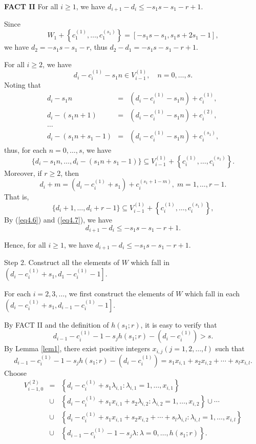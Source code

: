 \documentclass[12pt]{article}
\numberwithin{equation}{section}
\begin{document}
{\bf FACT II} For all $i\geqslant 1$, we have $d_{i+1}-d_{i}\leqslant -s_1s-s_1-r+1$.

Since $$W_{1}+\left\{c_{1}^{(1)},\ldots,c_{1}^{(s_1)}\right\}=[-s_1s-s_1,s_1s+2s_1-1],$$
we have $d_{2}=-s_1s-s_1-r$, thus $d_{2}-d_{1}=-s_1s-s_1-r+1$.

For all $i\geqslant 2$, we have \begin{equation}\label{iv-a}d_{i}-c_{i}^{(1)}-s_1 n\in V_{i-1}^{(1)}, \quad n=0,\ldots,s.\tag{iv-b}\end{equation}
Noting that
\begin{eqnarray*}
d_{i}-s_1 n&=&(d_{i}-c_{i}^{(1)}-s_1n)+c_{i}^{(1)},\nonumber\\
d_{i}-(s_1 n+1)&=&(d_{i}-c_{i}^{(1)}-s_1 n)+c_{i}^{(2)},\\
\ldots\nonumber\\
d_{i}-(s_1n+s_1-1)&=&(d_{i}-c_{i}^{(1)}-s_1 n)+c_{i}^{(s_1)},\nonumber
\end{eqnarray*}
thus, for each $n=0,\ldots,s$, we have
\begin{equation}\label{eq4.6}\{d_{i}-s_1n,\dots,d_{i}-(s_1n+s_1-1)\}\subseteq V_{i-1}^{(1)}+\left\{c_{i}^{(1)},\dots,c_{i}^{(s_1)}\right\}.\end{equation}
Moreover, if $r\geqslant 2$, then
$$d_{i}+m=(d_{i}-c_{i}^{(1)}+s_1)+c_{i}^{(s_1+1-m)}, \;m=1,\ldots,r-1.$$
That is,
\begin{equation}\label{eq4.7}\{d_{i}+1,\dots,d_{i}+r-1\}\subseteq V_{i-1}^{(1)}+\left\{c_{i}^{(1)},\dots,c_{i}^{(s_1)}\right\},\end{equation}
By (\ref{eq4.6}) and (\ref{eq4.7}), we have $$d_{i+1}-d_{i}\leqslant -s_1s-s_1-r+1.$$

Hence, for all $i\geqslant 1$, we have $d_{i+1}-d_{i}\leqslant -s_1s-s_1-r+1$.

Step 2. Construct all the elements of $W$ which fall in $\left(d_i-c_{i}^{(1)}+s_1, d_1-c_{i}^{(1)}-1\right]$.

 For each $i=2,3,\ldots$, we first construct the elements of $W$ which fall in each $\left(d_i-c_{i}^{(1)}+s_1, d_{i-1}-c_{i}^{(1)}-1\right]$.

By FACT II and the definition of $h(s_1;r)$, it is easy to verify that $$d_{i-1}-c_{i}^{(1)}-1-s_jh(s_1;r)-\left(d_{i}-c_{i}^{(1)}\right)>s.$$
By Lemma \ref{lem1}, there exist positive integers $x_{i,j}(j=1,2,\ldots,l)$ such that
$$d_{i-1}-c_{i}^{(1)}-1-s_jh(s_1;r)-\left(d_{i}-c_{i}^{(1)}\right)=s_1x_{i,1}+s_2x_{i,2}+\cdots+s_lx_{i,l}.$$
Choose \begin{eqnarray}\label{eeq2.4}V_{i-1,0}^{(2)}&=&\left\{d_{i}-c_{i}^{(1)}+s_1\lambda_{i,1}: \lambda_{i,1}=1,\ldots,x_{i,1}\right\}\nonumber
\\&\cup&\left\{d_{i}-c_{i}^{(1)}+s_1x_{i,1}+s_2\lambda_{i,2}: \lambda_{i,2}=1,\ldots,x_{i,2}\right\}\cup\cdots
\\&\cup& \left\{d_{i}-c_{i}^{(1)}+s_1x_{i,1}+s_2x_{i,2}+\cdots+s_l\lambda_{i,l}: \lambda_{i,l}=1,\ldots,x_{i,l}\right\}\nonumber\\
&\cup& \left\{ d_{i-1}-c_{i}^{(1)}-1-s_j\lambda:\lambda=0,\dots,h(s_1;r)\right\}.\nonumber\end{eqnarray}
\end{document}
